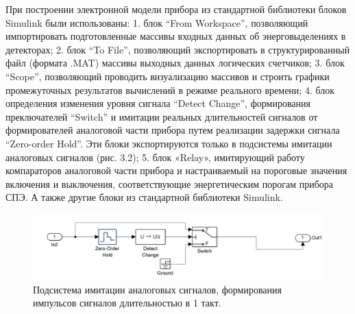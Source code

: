 При построении электронной модели прибора из стандартной библиотеки блоков Simulink были использованы:
1.	 блок “From Workspace”, позволяющий импортировать подготовленные массивы входных данных об энерговыделениях в детекторах;
2.	блок “To File”, позволяющий экспортировать в структурированный файл (формата .MAT) массивы выходных данных логических счетчиков;
3.	блок “Scope”, позволяющий проводить визуализацию массивов и строить графики промежуточных результатов вычислений в режиме реального времени;
4.	блок определения изменения уровня сигнала “Detect Change”, формирования преключателей “Switch” и имитации реальных длительностей сигналов от формирователей аналоговой части прибора путем реализации задержки сигнала “Zero-order Hold”. Эти блоки  экспортируются только в подсистемы имитации аналоговых сигналов (рис. 3.2);
5.	блок «Relay», имитирующий работу компараторов аналоговой части прибора и настраиваемый на пороговые значения включения и выключения, соответствующие энергетическим порогам прибора СПЭ.
А также другие блоки из стандартной библиотеки Simulink.

\begin{figure}
\centering
\includegraphics[width=0.7\linewidth]{images/simulink_analog}
\caption{Подсистема имитации аналоговых сигналов, формирования импульсов сигналов длительностью в 1 такт.}
\label{fig:simulink_analog}
\end{figure}


